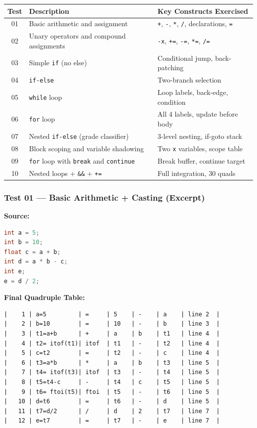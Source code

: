 \documentclass[11pt]{article}
\begin{document}
\begin{center}
\renewcommand{\arraystretch}{1.3}
\begin{tabular}{@{}cll@{}}
\toprule
\textbf{Test} & \textbf{Description} & \textbf{Key Constructs Exercised} \\
\midrule
01 & Basic arithmetic and assignment & \texttt{+}, \texttt{-}, \texttt{*}, \texttt{/}, declarations, \texttt{=} \\
02 & Unary operators and compound assignments & \texttt{-x}, \texttt{+=}, \texttt{-=}, \texttt{*=}, \texttt{/=} \\
03 & Simple \texttt{if} (no else) & Conditional jump, back-patching \\
04 & \texttt{if-else} & Two-branch selection \\
05 & \texttt{while} loop & Loop labels, back-edge, condition \\
06 & \texttt{for} loop & All 4 labels, update before body \\
07 & Nested \texttt{if-else} (grade classifier) & 3-level nesting, if-goto stack \\
08 & Block scoping and variable shadowing & Two \texttt{x} variables, scope table \\
09 & \texttt{for} loop with \texttt{break} and \texttt{continue} & Break buffer, continue target \\
10 & Nested loops + \texttt{\&\&} + \texttt{+=} & Full integration, 30 quads \\
\bottomrule
\end{tabular}
\end{center}

\subsubsection{Test 01 --- Basic Arithmetic + Casting (Excerpt)}

\textbf{Source:}
\begin{lstlisting}[style=cstyle, language=C]
int a = 5;
int b = 10;
float c = a + b;
int d = a * b - c;
int e;
e = d / 2;
\end{lstlisting}

\textbf{Final Quadruple Table:}
\begin{lstlisting}[style=outputstyle]
|    1 | a=5         | =     | 5    | -    | a    | line 2  |
|    2 | b=10        | =     | 10   | -    | b    | line 3  |
|    3 | t1=a+b      | +     | a    | b    | t1   | line 4  |
|    4 | t2= itof(t1)| itof  | t1   | -    | t2   | line 4  |
|    5 | c=t2        | =     | t2   | -    | c    | line 4  |
|    6 | t3=a*b      | *     | a    | b    | t3   | line 5  |
|    7 | t4= itof(t3)| itof  | t3   | -    | t4   | line 5  |
|    8 | t5=t4-c     | -     | t4   | c    | t5   | line 5  |
|    9 | t6= ftoi(t5)| ftoi  | t5   | -    | t6   | line 5  |
|   10 | d=t6        | =     | t6   | -    | d    | line 5  |
|   11 | t7=d/2      | /     | d    | 2    | t7   | line 7  |
|   12 | e=t7        | =     | t7   | -    | e    | line 7  |
\end{lstlisting}
\end{document}

